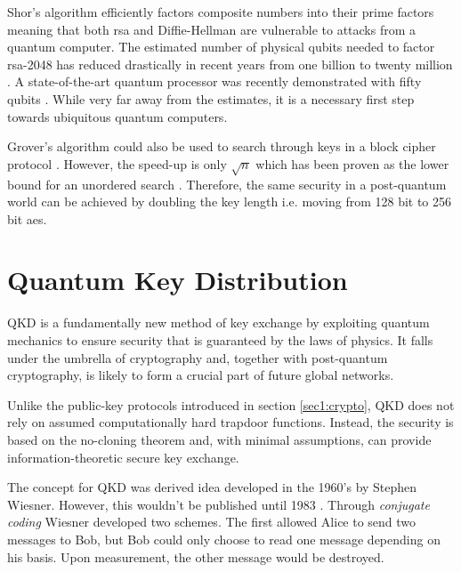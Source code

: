 
Shor's algorithm efficiently factors composite numbers into their prime factors \cite{shor1994} meaning that both \ac{rsa} and Diffie-Hellman are vulnerable to attacks from a quantum computer. The estimated number of physical qubits needed to factor \ac{rsa}-2048 has reduced drastically in recent years from one billion \cite{mosca2018, fowler2012} to twenty million \cite{gidney2019}. A state-of-the-art quantum processor was recently demonstrated with fifty qubits \cite{arute2019quantum}. While very far away from the estimates, it is a necessary first step towards ubiquitous quantum computers.

Grover's algorithm could also be used to search through keys in a block cipher protocol \cite{grover1996fast}. However, the speed-up is only $\sqrt{n}$ which has been proven as the lower bound for an unordered search \cite{Bennent1997}. Therefore, the same security in a post-quantum world can be achieved by doubling the key length i.e. moving from 128 bit to 256 bit \ac{aes}.

\section{Quantum Key Distribution}

\Acf{QKD} is a fundamentally new method of key exchange by exploiting quantum mechanics to ensure security that is guaranteed by the laws of physics. It falls under the umbrella of  cryptography and, together with post-quantum cryptography, is likely to form a crucial part of future global networks.

Unlike the public-key protocols introduced in section \ref{sec1:crypto}, \ac{QKD} does not rely on assumed computationally hard trapdoor functions. Instead, the security is based on the no-cloning theorem and, with minimal assumptions, can provide information-theoretic secure key exchange.

The concept for \ac{QKD} was derived idea developed in the 1960's by Stephen Wiesner. However, this wouldn't be published until 1983 \cite{quantum_money}. Through \emph{conjugate coding} Wiesner developed two schemes. The first allowed Alice to send two messages to Bob, but Bob could only choose to read one message depending on his basis. Upon measurement, the other message would be destroyed.

